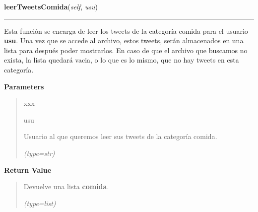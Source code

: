 \hspace{.8\funcindent}\begin{boxedminipage}{\funcwidth}

    \raggedright \textbf{leerTweetsComida}(\textit{self}, \textit{usu})

    \vspace{-1.5ex}

    \rule{\textwidth}{0.5\fboxrule}
\setlength{\parskip}{2ex}
    Esta función se encarga de leer los tweets de la categoría comida para 
    el usuario \textbf{usu}. Una vez que se accede al archivo, estos 
    tweets, serán almacenados en una lista para después poder mostrarlos. 
    En caso de que el archivo que buscamos no exista, la lista quedará 
    vacia, o lo que es lo mismo, que no hay tweets en esta categoría.

\setlength{\parskip}{1ex}
      \textbf{Parameters}
      \vspace{-1ex}

      \begin{quote}
        \begin{Ventry}{xxx}

          \item[usu]

          Usuario al que queremos leer sus tweets de la categoría comida.

            {\it (type=str)}

        \end{Ventry}

      \end{quote}

      \textbf{Return Value}
    \vspace{-1ex}

      \begin{quote}
      Devuelve una lista \textbf{comida}.

      {\it (type=list)}

      \end{quote}

    \end{boxedminipage}

    \label{funcionesTwitter:FuncionesTwitter:obtenerTweetsRopa}

    \vspace{0.5ex}

